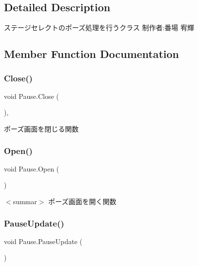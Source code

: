 \subsection{Detailed Description}
ステージセレクトのポーズ処理を行うクラス 制作者\+:番場 宥輝 



\subsection{Member Function Documentation}
\mbox{\label{class_pause_a36cf62bf6f61444398a76283c40372a3}} 
\subsubsection{\texorpdfstring{Close()}{Close()}}
{\footnotesize\ttfamily void Pause.\+Close (\begin{DoxyParamCaption}{ }\end{DoxyParamCaption})\hspace{0.3cm}{\ttfamily [inline]}, {\ttfamily [private]}}



ポーズ画面を閉じる関数 

\mbox{\label{class_pause_ab516653ae42cf624b0fc448f1616ed10}} 
\subsubsection{\texorpdfstring{Open()}{Open()}}
{\footnotesize\ttfamily void Pause.\+Open (\begin{DoxyParamCaption}{ }\end{DoxyParamCaption})\hspace{0.3cm}{\ttfamily [inline]}}

$<$summar$>$ ポーズ画面を開く関数 \mbox{\label{class_pause_a71b592c36b0dec43fd994e27eb324553}} 
\subsubsection{\texorpdfstring{Pause\+Update()}{PauseUpdate()}}
{\footnotesize\ttfamily void Pause.\+Pause\+Update (\begin{DoxyParamCaption}{ }\end{DoxyParamCaption})\hspace{0.3cm}{\ttfamily [inline]}}



